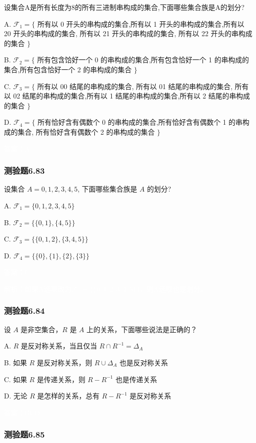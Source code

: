 \documentclass[UTF8, heading=true]{ctexart}
\begin{document}
设集合A是所有长度为8的所有三进制串构成的集合,下面哪些集合族是A的划分?

A. $\mathcal{F}_1=\{$ 所有以 0 开头的串构成的集合,所有以 1 开头的串构成的集合,所有以 20 开头的串构成的集合, 所有以 21 开头的串构成的集合, 所有以 22 开头的串构成的集合 $\}$

B. $\mathcal{F}_2=\{$ 所有包含饸好一个 0 的串构成的集合,所有包含恰好一个 1 的串构成的集合,所有包含恰好一个 2 的串构成的集合 $\}$

C. $\mathcal{F}_3=\{$ 所有以 00 结尾的串构成的集合, 所有以 01 结尾的串构成的集合, 所有以 02 结尾的串构成的集合,所有以 1 结尾的串构成的集合,所有以 2 结尾的串构成的集合 $\}$

D. $\mathcal{F}_4=\{$ 所有恰好含有偶数个 0 的串构成的集合,所有恰好含有偶数个 1 的串构成的集合, 所有恰好含有偶数个 2 的串构成的集合 $\}$

\textcolor{white}{答案：A}

\subsubsection{测验题6.83}
设集合 $A={0,1,2,3,4,5}$, 下面哪些集合族是 $A$ 的划分?

A. $\mathcal{F}_1=\{0,1,2,3,4,5\}$

B. $\mathcal{F}_2=\{\{0,1\},\{4,5\}\}$

C. $\mathcal{F}_3=\{\{0,1,2\},\{3,4,5\}\}$

D. $\mathcal{F}_4=\{\{0\},\{1\},\{2\},\{3\}\}$

\textcolor{white}{答案：C}

\textcolor{white}{解析：如果A选项改为$\mathcal{F}_1=\{\{0,1,2,3,4,5\}\}$，则A选项也是划分。}

\subsubsection{测验题6.84}

设 $A$ 是非空集合，$R$ 是 $A$ 上的关系，下面哪些说法是正确的？

A. $R$ 是反对称关系，当且仅当 $R \cap R^{-1}=\Delta_A$

B. 如果 $R$ 是反对称关系，则 $R \cup \Delta_A$ 也是反对称关系

C. 如果 $R$ 是传递关系，则 $R-R^{-1}$ 也是传递关系

D.  无论 $R$ 是怎样的关系，总有 $R-R^{-1}$ 是反对称关系

\textcolor{white}{答案：BCD}

\subsubsection{测验题6.85}
\end{document}
